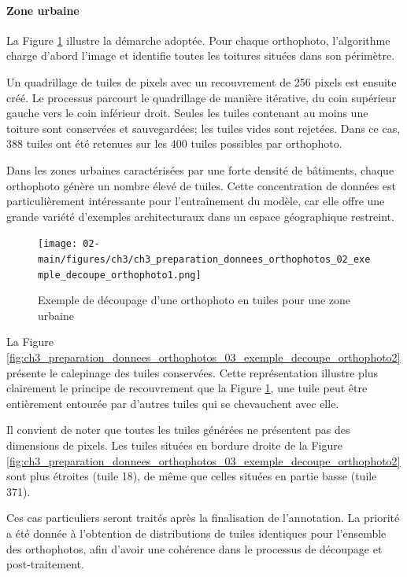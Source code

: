 \newpage
\paragraph{Zone urbaine}
La Figure \ref{fig:ch3_preparation_donnees_orthophotos_02_exemple_decoupe_orthophoto1} illustre la démarche adoptée. Pour chaque orthophoto, l'algorithme charge d'abord l'image et identifie toutes les toitures situées dans son périmètre. 

Un quadrillage de tuiles de \si{} pixels avec un recouvrement de 256 pixels est ensuite créé. Le processus parcourt le quadrillage de manière itérative, du coin supérieur gauche vers le coin inférieur droit. Seules les tuiles contenant au moins une toiture sont conservées et sauvegardées; les tuiles vides sont rejetées. Dans ce cas, 388 tuiles ont été retenues sur les 400 tuiles possibles par orthophoto.

Dans les zones urbaines caractérisées par une forte densité de bâtiments, chaque orthophoto génère un nombre élevé de tuiles. Cette concentration de données est particulièrement intéressante pour l'entraînement du modèle, car elle offre une grande variété d'exemples architecturaux dans un espace géographique restreint.

\begin{figure}[H]
    \centering
    \texttt{[image: 02-main/figures/ch3/ch3\_preparation\_donnees\_orthophotos\_02\_exemple\_decoupe\_orthophoto1.png]}
    \caption{Exemple de découpage d'une orthophoto en tuiles pour une zone urbaine}
    \label{fig:ch3_preparation_donnees_orthophotos_02_exemple_decoupe_orthophoto1}
\end{figure}

\newpage
La Figure \ref{fig:ch3_preparation_donnees_orthophotos_03_exemple_decoupe_orthophoto2} présente le calepinage des tuiles conservées. Cette représentation illustre plus clairement le principe de recouvrement que la Figure \ref{fig:ch3_preparation_donnees_orthophotos_02_exemple_decoupe_orthophoto1}, une tuile peut être entièrement entourée par d'autres tuiles qui se chevauchent avec elle.

Il convient de noter que toutes les tuiles générées ne présentent pas des dimensions de \si{} pixels. Les tuiles situées en bordure droite de la Figure \ref{fig:ch3_preparation_donnees_orthophotos_03_exemple_decoupe_orthophoto2} sont plus étroites (tuile 18), de même que celles situées en partie basse (tuile 371).

Ces cas particuliers seront traités après la finalisation de l'annotation. La priorité a été donnée à l'obtention de distributions de tuiles identiques pour l'ensemble des orthophotos, afin d'avoir une cohérence dans le processus de découpage et post-traitement.

